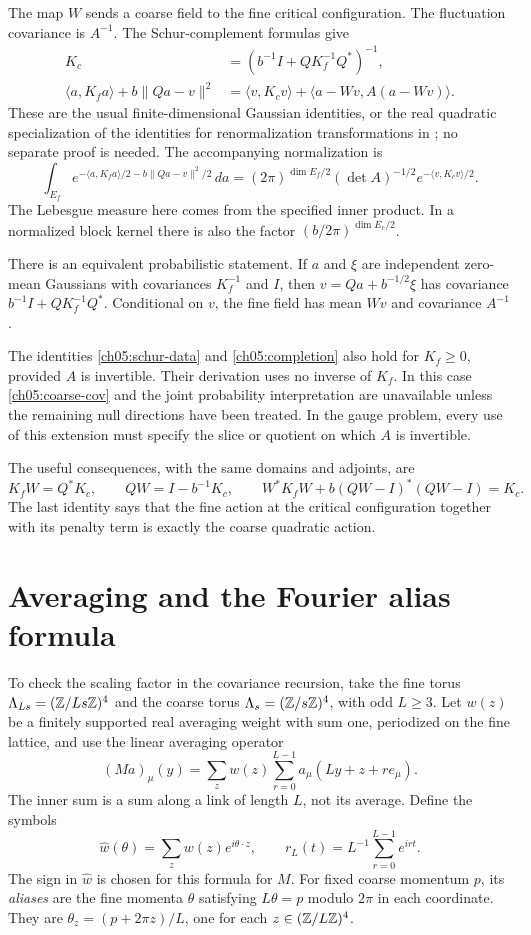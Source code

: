 The map $W$ sends a coarse field to the fine critical configuration. The
fluctuation covariance is $A^{-1}$. The Schur-complement formulas give
\begin{align}
 K_c&=(b^{-1}I+QK_f^{-1}Q^*)^{-1}, \label{ch05:coarse-cov}\\
 \langle a,K_fa\rangle+b\|Qa-v\|^2
 &=\langle v,K_cv\rangle+\langle a-Wv,A(a-Wv)\rangle .
 \label{ch05:completion}
\end{align}
These are the usual finite-dimensional Gaussian identities, or the
real quadratic specialization of the identities for renormalization transformations in
\cite{BalabanFeldmanKnoerrerTrubowitz2016}; no separate proof is needed.
The accompanying normalization is
\[
 \int_{E_f}e^{-\langle a,K_fa\rangle/2-b\|Qa-v\|^2/2}\,da
 =(2\pi)^{\dim E_f/2}(\det A)^{-1/2}
            e^{-\langle v,K_cv\rangle/2}.
\]
The Lebesgue measure here comes from the specified inner product.
In a normalized block kernel there is also the factor
$(b/2\pi)^{\dim E_c/2}$.

There is an equivalent probabilistic statement. If $a$ and $\xi$ are
independent zero-mean Gaussians with covariances $K_f^{-1}$ and $I$,
then $v=Qa+b^{-1/2}\xi$ has covariance
$b^{-1}I+QK_f^{-1}Q^*$. Conditional on $v$, the fine field has mean
$Wv$ and covariance $A^{-1}$.

The identities \eqref{ch05:schur-data} and
\eqref{ch05:completion} also hold for $K_f\ge0$, provided $A$ is
invertible. Their derivation uses no inverse of $K_f$.
In this case \eqref{ch05:coarse-cov} and the joint probability
interpretation are unavailable unless the remaining null directions have
been treated. In the gauge problem, every use of this extension must
specify the slice or quotient on which $A$ is invertible.

The useful consequences, with the same domains and adjoints, are
\[
 K_fW=Q^*K_c,\qquad QW=I-b^{-1}K_c,\qquad
 W^*K_fW+b(QW-I)^*(QW-I)=K_c.
\]
The last identity says that the fine action at the critical configuration together with
its penalty term is exactly the coarse quadratic action.

\section{Averaging and the Fourier alias formula}
\label{ch05:alias}

To check the scaling factor in the covariance recursion, take the fine torus
$\Lambda_{Ls}=(\mathbb Z/Ls\mathbb Z)^4$ and the coarse torus $\Lambda_s=(\mathbb Z/s\mathbb Z)^4$, with
odd $L\ge3$. Let $w(z)$ be a finitely supported real averaging weight
with sum one, periodized on the fine lattice, and use the linear averaging operator
\[
 (Ma)_\mu(y)=\sum_z w(z)\sum_{r=0}^{L-1}
                    a_\mu(Ly+z+re_\mu).
\]
The inner sum is a sum along a link of length $L$, not its average.
Define the symbols
\[
 \widehat w(\theta)=\sum_z w(z)e^{i\theta\cdot z},
 \qquad r_L(t)=L^{-1}\sum_{r=0}^{L-1}e^{irt}.
\]
The sign in $\widehat w$ is chosen for this formula for $M$.
For fixed coarse momentum $p$, its \emph{aliases} are the fine momenta
$\theta$ satisfying $L\theta=p$ modulo $2\pi$ in each coordinate.
They are $\theta_z=(p+2\pi z)/L$, one for each $z\in(\mathbb Z/L\mathbb Z)^4$.

